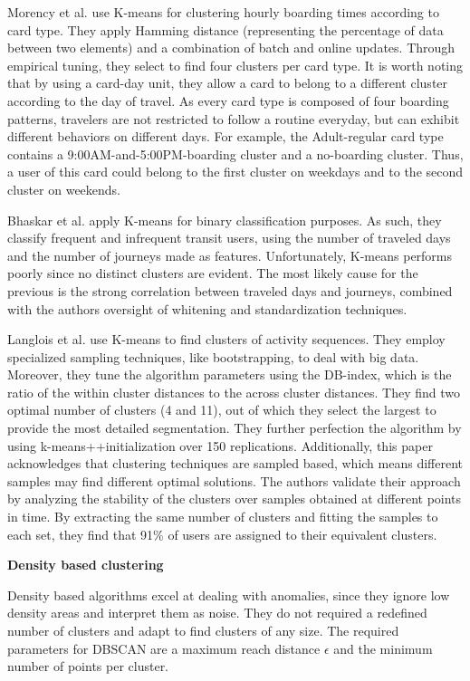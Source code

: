 \documentclass{article}
\begin{document}
Morency et al. \cite{morency2007measuring} use K-means for clustering hourly boarding times according to card type. They apply Hamming distance (representing the percentage of data between two elements) and a combination of batch and online updates. Through empirical tuning, they select to find four clusters per card type. It is worth noting that by using a card-day unit, they allow a card to belong to a different cluster according to the day of travel. As every card type is composed of four boarding patterns, travelers are not restricted to follow a routine everyday, but can exhibit different behaviors on different days. For example, the Adult-regular card type contains a 9:00AM-and-5:00PM-boarding cluster and a no-boarding cluster. Thus, a user of this card could belong to the first cluster on weekdays and to the second cluster on weekends. 

Bhaskar et al. \cite{bhaskar2015passenger} apply K-means for binary classification purposes. As such, they classify frequent and infrequent transit users, using the number of traveled days and the number of journeys made as features. Unfortunately, K-means performs poorly since no distinct clusters are evident. The most likely cause for the previous is the strong correlation between traveled days and journeys, combined with the authors oversight of whitening and standardization techniques. 

Langlois et al. \cite{langlois2016inferring} use K-means to find clusters of activity sequences. They employ specialized sampling techniques, like bootstrapping, to deal with big data.  Moreover, they tune the algorithm parameters using the DB-index, which is the ratio of the within cluster distances to the across cluster distances. They find two optimal number of clusters (4 and 11), out of which they select the largest to provide the most detailed segmentation. They further perfection the algorithm by using k-means++initialization over 150 replications. Additionally, this paper acknowledges that clustering techniques are sampled based, which means different samples may find different optimal solutions. The authors validate their approach by analyzing the stability of the clusters over samples obtained at different points in time. By extracting the same number of clusters and fitting the samples to each set, they find that 91\% of users are assigned to their equivalent clusters. 

\textbf{Density based clustering}

Density based algorithms excel at dealing with anomalies, since they ignore low density areas and interpret them as noise. They do not required a redefined number of clusters and adapt to find clusters of any size. The required parameters for DBSCAN are a maximum reach distance $\epsilon$ and the minimum number of points per cluster.
\end{document}
